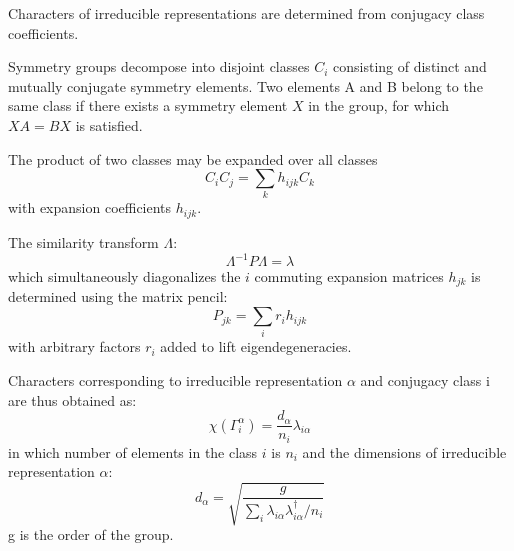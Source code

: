 \documentclass[preprint,showpacs,preprintnumbers,superscriptaddress,prb,floatfix,aps]{revtex4-1}
\begin{document}
Characters of irreducible representations are determined from conjugacy class coefficients\cite{burnside_theory_2010,mckay_construction_1970,unger_computing_2006,schneider_dixons_1990,dixon_high_1967}.

Symmetry groups decompose into disjoint classes $C_i$ consisting of distinct and mutually conjugate symmetry elements. Two elements A and B belong to the same class if there exists a symmetry element $X$ in the group, for which $XA = BX$ is satisfied.

The product of two classes may be expanded over all classes
\begin{equation}
\label{eq:class_coefficients}
C_i C_j = \sum_k h_{ijk} C_k
\end{equation}
with expansion coefficients $h_{ijk}$.

The similarity transform $\Lambda$:
\begin{equation}
\Lambda^{-1} P \Lambda = \lambda
\end{equation}
which simultaneously diagonalizes the $i$ commuting expansion matrices $h_{jk}$ is determined using the matrix pencil:
\begin{equation}
\label{eq:matrix_pencil}
P_{jk} = \sum_i r_i h_{ijk}
\end{equation}
with arbitrary factors $r_i$ added to lift eigendegeneracies.


Characters corresponding to irreducible representation $\alpha$ and conjugacy class i are thus obtained as:
\begin{equation}
\label{eq:irrep_characters}
\chi\left(\Gamma_i^\alpha\right) = \frac{d_\alpha}{n_i} \lambda_{i\alpha}
\end{equation}
in which number of elements in the class $i$ is $n_i$ and the dimensions of irreducible representation $\alpha$:
\begin{equation}
\label{eq:irrep_dimension}
d_\alpha = \sqrt{ \frac{g}{\sum_i \lambda_{i\alpha} \lambda_{i\alpha}^\dag / n_i }  }
\end{equation}
g is the order of the group.
 
\end{document}

